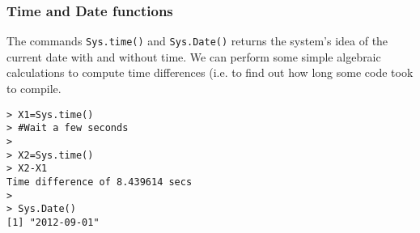 \documentclass{beamer}
\begin{document}
\begin{frame}[fragile]
\frametitle{Time and Date functions}
The commands \texttt{Sys.time()} and \texttt{Sys.Date()} returns the system's idea of the current date with and without time.
We can perform some simple algebraic calculations to compute time differences (i.e. to find out how long some code took to compile.
\begin{framed}
\begin{verbatim}
> X1=Sys.time()
> #Wait a few seconds
>
> X2=Sys.time()
> X2-X1
Time difference of 8.439614 secs
>
> Sys.Date() 
[1] "2012-09-01"
\end{verbatim}
\end{framed}
\end{frame}
\end{document}
